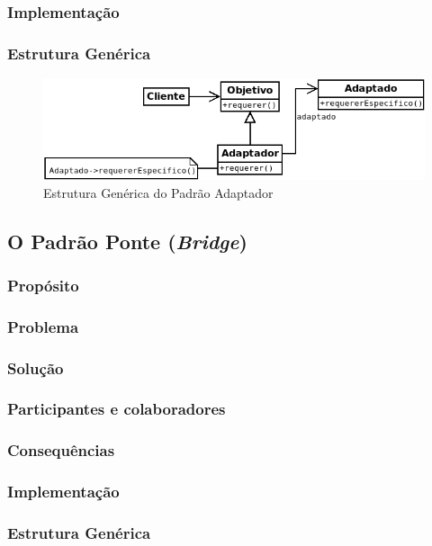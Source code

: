 \subsubsection{Implementação}
\subsubsection{Estrutura Genérica}

\begin{figure}[h]
\begin{center}
\includegraphics[scale=0.6]{adaptador.png}
\caption{Estrutura Genérica do Padrão Adaptador}\label{fig:adaptador}
\end{center}
\end{figure}

\subsection{O Padrão Ponte (\textit{Bridge})}
\subsubsection{Propósito}
\subsubsection{Problema}
\subsubsection{Solução}
\subsubsection{Participantes e colaboradores}
\subsubsection{Consequências}
\subsubsection{Implementação}
\subsubsection{Estrutura Genérica}

